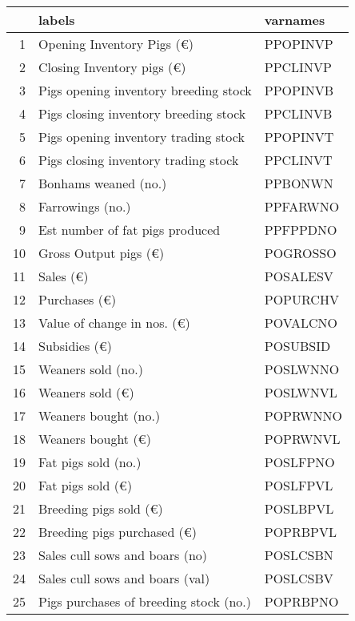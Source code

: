 \documentclass{article}\usepackage{graphicx, color}
\begin{document}
\begin{flushleft}
\newpage
\begin{table}[ht]
\begin{center}
\begin{tabular}{rll}
  \hline
 & labels & varnames \\ 
  \hline
1 & Opening Inventory Pigs   (€) & PPOPINVP \\ 
  2 & Closing Inventory pigs   (€) & PPCLINVP \\ 
  3 & Pigs opening inventory breeding stock & PPOPINVB \\ 
  4 & Pigs closing inventory breeding stock & PPCLINVB \\ 
  5 & Pigs opening inventory trading stock & PPOPINVT \\ 
  6 & Pigs closing inventory trading stock & PPCLINVT \\ 
  7 & Bonhams weaned          (no.) & PPBONWN \\ 
  8 & Farrowings              (no.) & PPFARWNO \\ 
  9 & Est number of fat pigs produced & PPFPPDNO \\ 
  10 & Gross Output pigs       (€) & POGROSSO \\ 
  11 & Sales                   (€) & POSALESV \\ 
  12 & Purchases               (€) & POPURCHV \\ 
  13 & Value of change in nos. (€) & POVALCNO \\ 
  14 & Subsidies               (€) & POSUBSID \\ 
  15 & Weaners sold            (no.) & POSLWNNO \\ 
  16 & Weaners sold            (€) & POSLWNVL \\ 
  17 & Weaners bought          (no.) & POPRWNNO \\ 
  18 & Weaners bought           (€) & POPRWNVL \\ 
  19 & Fat pigs sold           (no.) & POSLFPNO \\ 
  20 & Fat pigs sold            (€) & POSLFPVL \\ 
  21 & Breeding pigs sold       (€) & POSLBPVL \\ 
  22 & Breeding pigs purchased  (€) & POPRBPVL \\ 
  23 & Sales cull sows and boars   (no) & POSLCSBN \\ 
  24 & Sales cull sows and boars   (val) & POSLCSBV \\ 
  25 & Pigs purchases of breeding stock  (no.) & POPRBPNO \\ 

\end{tabular}
\end{center}
\end{table}
\end{flushleft}
\end{document}

